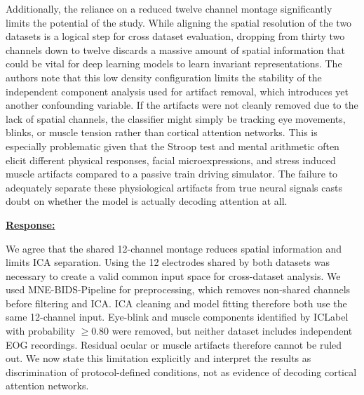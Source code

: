 \documentclass{article}
\begin{document}
\begin{cmt}{}{}

Additionally, the reliance on a reduced twelve channel montage significantly
limits the potential of the study. While aligning the spatial resolution of the
two datasets is a logical step for cross dataset evaluation, dropping from
thirty two channels down to twelve discards a massive amount of spatial
information that could be vital for deep learning models to learn invariant
representations. The authors note that this low density configuration limits the
stability of the independent component analysis used for artifact removal, which
introduces yet another confounding variable. If the artifacts were not cleanly
removed due to the lack of spatial channels, the classifier might simply be
tracking eye movements, blinks, or muscle tension rather than cortical attention
networks. This is especially problematic given that the Stroop test and mental
arithmetic often elicit different physical responses, facial microexpressions,
and stress induced muscle artifacts compared to a passive train driving
simulator. The failure to adequately separate these physiological artifacts from
true neural signals casts doubt on whether the model is actually decoding
attention at all.

\end{cmt}
\vspace{0.1cm}
\noindent
\underline{\textbf{Response:}}
\vspace{0.2cm}

We agree that the shared 12-channel montage reduces spatial information and
limits ICA separation. Using the 12 electrodes shared by both datasets was
necessary to create a valid common input space for cross-dataset analysis. We
used MNE-BIDS-Pipeline for preprocessing, which removes non-shared channels
before filtering and ICA. ICA cleaning and model fitting therefore both use the
same 12-channel input. Eye-blink and muscle components identified by ICLabel
with probability $\geq$0.80 were removed, but neither dataset includes
independent EOG recordings. Residual ocular or muscle artifacts therefore
cannot be ruled out. We now state this limitation explicitly and interpret the
results as discrimination of protocol-defined conditions, not as evidence of
decoding cortical attention networks.

\vspace{0.3cm}
\end{document}

